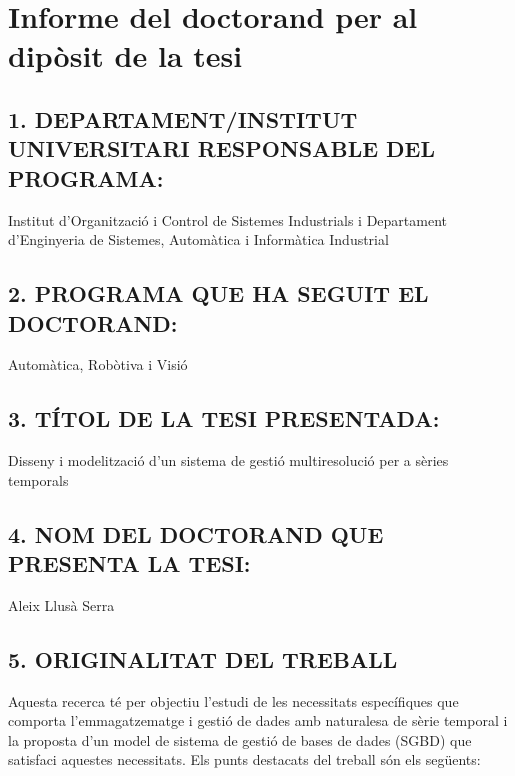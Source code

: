 \documentclass{scrartcl}
\begin{document}
\section*{Informe del doctorand per al dipòsit de la tesi}


\subsection*{1. DEPARTAMENT/INSTITUT UNIVERSITARI RESPONSABLE DEL PROGRAMA:}

Institut  d’Organització i Control de Sistemes Industrials i Departament d'Enginyeria de Sistemes, Automàtica i Informàtica Industrial

\subsection*{2. PROGRAMA QUE HA SEGUIT EL DOCTORAND:}

Automàtica, Robòtiva i Visió


\subsection*{3. TÍTOL DE LA TESI PRESENTADA:}


Disseny i modelització d'un sistema de gestió multiresolució per a sèries temporals




\subsection*{4. NOM DEL DOCTORAND QUE PRESENTA LA TESI:}

Aleix Llusà Serra







\subsection*{5. ORIGINALITAT DEL TREBALL}


Aquesta recerca té per objectiu l'estudi de les necessitats
específiques que comporta l'emmagatzematge i gestió de dades amb
naturalesa de sèrie temporal i la proposta d'un model de sistema de
gestió de bases de dades (SGBD) que satisfaci aquestes
necessitats. Els punts destacats del treball són els següents:
\end{document}
